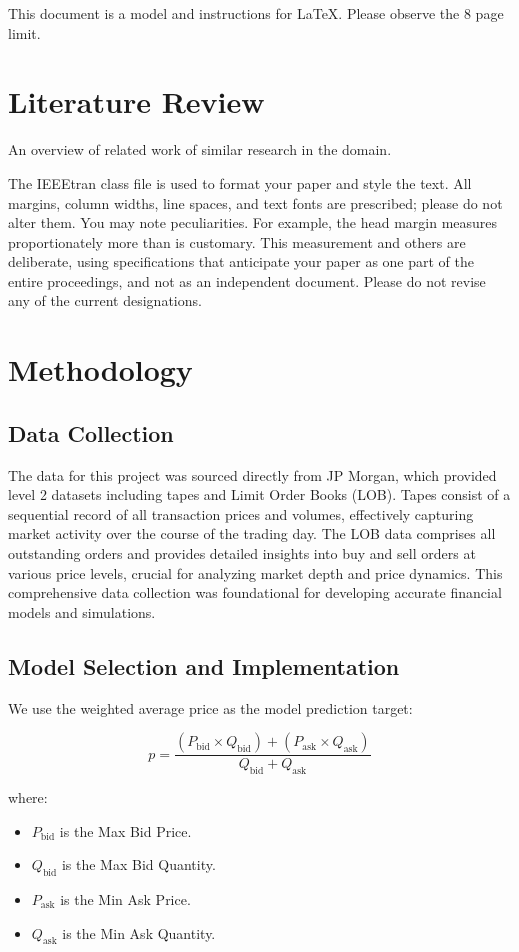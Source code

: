 \documentclass[conference]{IEEEtran}
\begin{document}
This document is a model and instructions for \LaTeX.
Please observe the 8 page limit.

\section{Literature Review}
{\color{blue}An overview of related work of similar research in the domain.}

The IEEEtran class file is used to format your paper and style the text. All margins,
column widths, line spaces, and text fonts are prescribed; please do not
alter them. You may note peculiarities. For example, the head margin
measures proportionately more than is customary. This measurement
and others are deliberate, using specifications that anticipate your paper
as one part of the entire proceedings, and not as an independent document.
Please do not revise any of the current designations.

\section{Methodology}
\subsection{Data Collection}

The data for this project was sourced directly from JP Morgan, which provided level 2 datasets including tapes and Limit Order Books (LOB). Tapes consist of a sequential record of all transaction prices and volumes, effectively capturing market activity over the course of the trading day. The LOB data comprises all outstanding orders and provides detailed insights into buy and sell orders at various price levels, crucial for analyzing market depth and price dynamics. This comprehensive data collection was foundational for developing accurate financial models and simulations.



\subsection{Model Selection and Implementation}
We use the weighted average price as the model prediction target\cite{transactions}:

\[
p = \frac{(P_{\text{bid}} \times Q_{\text{bid}}) + (P_{\text{ask}} \times Q_{\text{ask}})}{Q_{\text{bid}} + Q_{\text{ask}}}
\]

where:
\begin{itemize}
    \item \( P_{\text{bid}} \) is the Max Bid Price.
    \item \( Q_{\text{bid}} \) is the Max Bid Quantity.
    \item \( P_{\text{ask}} \) is the Min Ask Price.
    \item \( Q_{\text{ask}} \) is the Min Ask Quantity.
\end{itemize}
\end{document}
